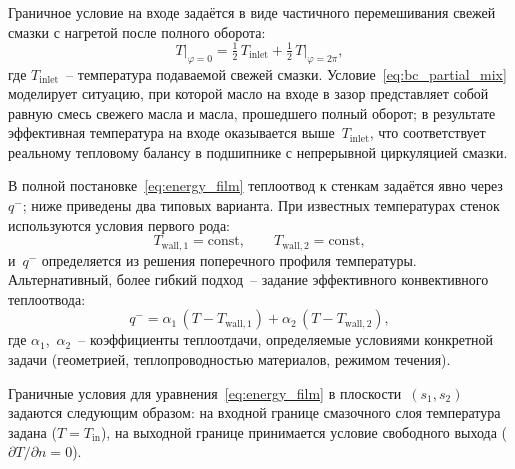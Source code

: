 Граничное условие на входе задаётся в виде частичного перемешивания
свежей смазки с нагретой после полного оборота:
\begin{equation}
  T\big|_{\varphi=0}
  = \tfrac{1}{2}\,T_{\mathrm{inlet}}
  + \tfrac{1}{2}\,T\big|_{\varphi=2\pi},
  \label{eq:bc_partial_mix}
\end{equation}
где $T_{\mathrm{inlet}}$~-- температура подаваемой свежей смазки.
Условие~\eqref{eq:bc_partial_mix} моделирует ситуацию, при которой
масло на входе в зазор представляет собой равную смесь свежего масла
и масла, прошедшего полный оборот; в результате эффективная
температура на входе оказывается выше~$T_{\mathrm{inlet}}$, что
соответствует реальному тепловому балансу в подшипнике с непрерывной
циркуляцией смазки.

В полной постановке~\eqref{eq:energy_film} теплоотвод к стенкам задаётся явно через~$q^{-}$; ниже приведены два типовых варианта. При известных температурах стенок используются условия первого рода:
\[
  T_{\mathrm{wall},1} = \mathrm{const}, \qquad
  T_{\mathrm{wall},2} = \mathrm{const},
\]
и~$q^{-}$ определяется из решения поперечного профиля
температуры. Альтернативный, более гибкий подход~-- задание
эффективного конвективного теплоотвода:
\[
  q^{-} = \alpha_1\,(T - T_{\mathrm{wall},1})
         + \alpha_2\,(T - T_{\mathrm{wall},2}),
\]
где $\alpha_1$,~$\alpha_2$~-- коэффициенты теплоотдачи,
определяемые условиями конкретной задачи (геометрией,
теплопроводностью материалов, режимом течения).

Граничные условия для уравнения~\eqref{eq:energy_film}
в плоскости~$(s_1, s_2)$ задаются следующим образом:
на входной границе смазочного слоя температура задана
($T = T_{\mathrm{in}}$), на выходной границе принимается
условие свободного выхода ($\partial T/\partial n = 0$).

